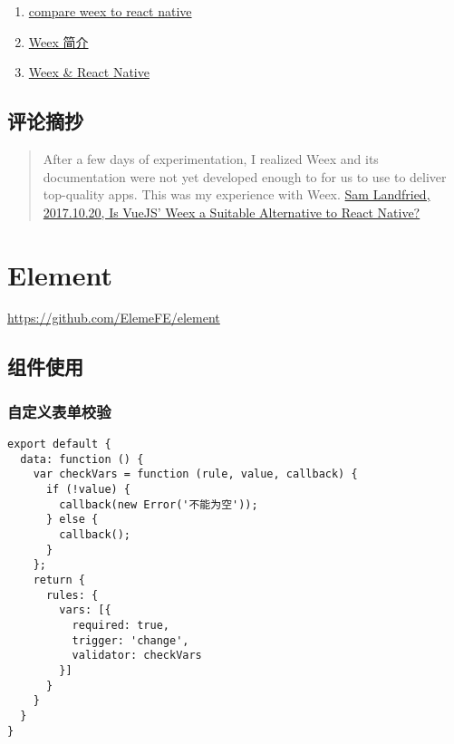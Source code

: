 \begin{enumerate}
\def\labelenumi{\arabic{enumi}.}
\tightlist
\item
  \href{https://www.gitbook.com/book/xiaomaer/compare-weex-to-react-native/details}{compare
  weex to react native}
\item
  \href{http://slides.com/ciyinhuang/weex\#/}{Weex 简介}
\item
  \href{http://zfx5130.me/blog/2016/09/15/Weex-\&-React-Native/}{Weex \&
  React Native}
\end{enumerate}

\subsection{评论摘抄}\label{ux8bc4ux8bbaux6458ux6284}

\begin{quote}
After a few days of experimentation, I realized Weex and its
documentation were not yet developed enough to for us to use to deliver
top-quality apps. This was my experience with Weex.
\href{https://www.bignerdranch.com/blog/is-vuejs-weex-a-suitable-alternative-to-react-native/}{Sam
Landfried, 2017.10.20, Is VueJS' Weex a Suitable Alternative to React
Native?}
\end{quote}

\section{Element}\label{element}

\url{https://github.com/ElemeFE/element}

\subsection{组件使用}\label{ux7ec4ux4ef6ux4f7fux7528}

\subsubsection{自定义表单校验}\label{ux81eaux5b9aux4e49ux8868ux5355ux6821ux9a8c}

\begin{lstlisting}
export default {
  data: function () {
    var checkVars = function (rule, value, callback) {
      if (!value) {
        callback(new Error('不能为空'));
      } else {
        callback();
      }
    };
    return {
      rules: {
        vars: [{
          required: true,
          trigger: 'change',
          validator: checkVars
        }]
      }
    }
  }
}
\end{lstlisting}

